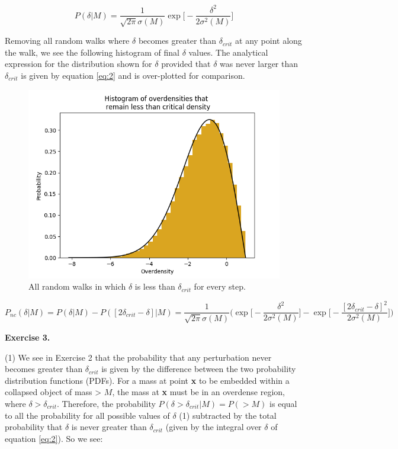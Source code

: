 \documentclass[a4paper]{article}
\begin{document}
\begin{equation}
P(\delta|M) = \dfrac{1}{\sqrt{2 \pi}\sigma(M)}\exp \Big[ - \dfrac{\delta^2}{2\sigma^2(M)} \Big]
\label{eq:1}
\end{equation}

Removing all random walks where $\delta$ becomes greater than $\delta_{crit}$ at any point along the walk, we see the following histogram of final $\delta$ values. The analytical expression for the distribution shown for $\delta$ provided that $\delta$ was never larger than $\delta_{crit}$ is given by equation \ref{eq:2} and is over-plotted for comparison.

\begin{figure}[h]
\centering
\includegraphics[scale=0.475]{undercrit}
\caption{All random walks in which $\delta$ is less than $\delta_{crit}$ for every step.}
\end{figure}

\begin{equation}
P_{nc}(\delta|M) = P(\delta|M) - P([2\delta_{crit} - \delta]|M) = \dfrac{1}{\sqrt{2 \pi}\sigma(M)} \Big( \exp \Big[ - \dfrac{\delta^2}{2\sigma^2(M)} \Big] - \exp \Big[ - \dfrac{[2\delta_{crit}-\delta]^2}{2\sigma^2(M)} \Big] \Big)
\label{eq:2}
\end{equation}
\clearpage

\textbf{Exercise 3.}

(1) We see in Exercise 2 that the probability that any perturbation never becomes greater than $\delta_{crit}$ is given by the difference between the two probability distribution functions (PDFs). For a mass at point \textbf{x} to be embedded within a collapsed object of mass > $M$, the mass at \textbf{x} must be in an overdense region, where $\delta > \delta_{crit}$. Therefore, the probability $P(\delta > \delta_{crit} | M) = P(>M)$ is equal to all the probability for all possible values of $\delta$ (1) subtracted by the total probability that $\delta$ is never greater than $\delta_{crit}$ (given by the integral over $\delta$ of equation \ref{eq:2}). So we see:
\end{document}
